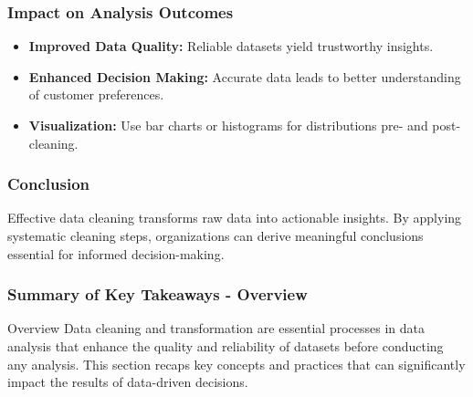 \documentclass[aspectratio=169]{beamer}
\begin{document}
\begin{frame}
    \frametitle{Impact on Analysis Outcomes}
    \begin{itemize}
        \item \textbf{Improved Data Quality:} Reliable datasets yield trustworthy insights.
        \item \textbf{Enhanced Decision Making:} Accurate data leads to better understanding of customer preferences.
        \item \textbf{Visualization:} Use bar charts or histograms for distributions pre- and post-cleaning.
    \end{itemize}
\end{frame}

\begin{frame}
    \frametitle{Conclusion}
    Effective data cleaning transforms raw data into actionable insights. By applying systematic cleaning steps, organizations can derive meaningful conclusions essential for informed decision-making.
\end{frame}

\begin{frame}[fragile]
    \frametitle{Summary of Key Takeaways - Overview}
    \begin{block}{Overview}
        Data cleaning and transformation are essential processes in data analysis that enhance the quality and reliability of datasets before conducting any analysis. This section recaps key concepts and practices that can significantly impact the results of data-driven decisions.
    \end{block}
\end{frame}
\end{document}
